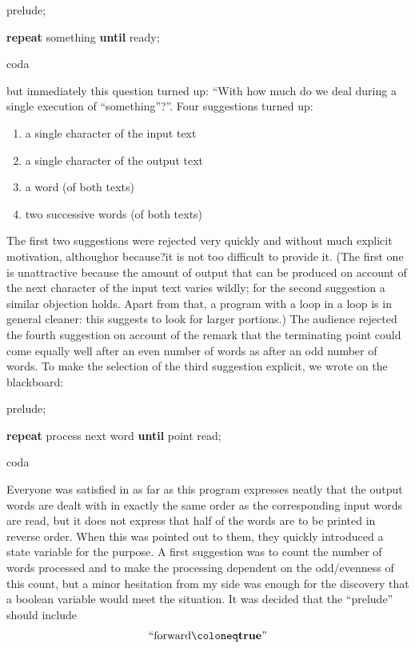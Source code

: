 \quad prelude;

\quad \textbf{repeat} something \textbf{until} ready;

\quad coda

\noindent
but immediately this question turned up: ``With how much do we deal during a single execution of ``something''?''. Four suggestions turned up:

\begin{enumerate}[wide, nosep, label=(\arabic*)]
	\item a single character of the input text
	\item a single character of the output text
	\item a word (of both texts)
	\item two successive words (of both texts)
\end{enumerate}

The first two suggestions were rejected very quickly and without much explicit motivation, although\textemdash{}or because?\textemdash{}it is not too difficult to provide it. (The first one is unattractive because the amount of output that can be produced on account of the next character of the input text varies wildly; for the second suggestion a similar objection holds. Apart from that, a program with a loop in a loop is in general cleaner: this suggests to look for larger portions.) The audience rejected the fourth suggestion on account of the remark that the terminating point could come equally well after an even number of words as after an odd number of words. To make the selection of the third suggestion explicit, we wrote on the blackboard:

\quad prelude;

\quad \textbf{repeat} process next word \textbf{until} point read;

\quad coda

Everyone was satisfied in as far as this program expresses neatly that the output words are dealt with in exactly the same order as the corresponding input words are read, but it does not express that half of the words are to be printed in reverse order. When this was pointed out to them, they quickly introduced a state variable for the purpose. A first suggestion was to count the number of words processed and to make the processing dependent on the odd/evenness of this count, but a minor hesitation from my side was enough for the discovery that a boolean variable would meet the situation. It was decided that the ``prelude'' should include
$$
\text{``forward} \coloneq \text{\textbf{true}''}
$$

